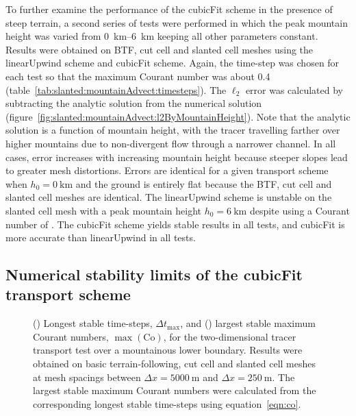 To further examine the performance of the cubicFit scheme in the presence of steep terrain, a second series of tests were performed in which the peak mountain height was varied from \SIrange{0}{6}{\kilo\meter} keeping all other parameters constant.
Results were obtained on BTF, cut cell and slanted cell meshes using the linearUpwind scheme and cubicFit scheme.  Again, the time-step was chosen for each test so that the maximum Courant number was about \num{0.4} (table~\ref{tab:slanted:mountainAdvect:timesteps}).  The $\ell_2$ error was calculated by subtracting the analytic solution from the numerical solution (figure~\ref{fig:slanted:mountainAdvect:l2ByMountainHeight}).
Note that the analytic solution is a function of mountain height, with the tracer travelling farther over higher mountains due to non-divergent flow through a narrower channel.
In all cases, error increases with increasing mountain height because steeper slopes lead to greater mesh distortions.
Errors are identical for a given transport scheme when $h_0 = \SI{0}{\kilo\meter}$ and the ground is entirely flat because the BTF, cut cell and slanted cell meshes are identical.
The linearUpwind scheme is unstable on the slanted cell mesh with a peak mountain height $h_0 = \SI{6}{\kilo\meter}$ despite using a Courant number of \unskip.
The cubicFit scheme yields stable results in all tests, and cubicFit is more accurate than linearUpwind in all tests.

\subsection{Numerical stability limits of the cubicFit transport scheme}

\begin{figure}
	\begin{subfigure}{\textwidth}
		\centering
		
		\label{fig:slanted:mountainAdvect:maxdt:dt}
		\label{fig:slanted:mountainAdvect:maxdt:co}
	\end{subfigure}
	\caption{() Longest stable time-steps, $\Delta t_\mathrm{max}$, and 
	() largest stable maximum Courant numbers, $\max(\mathrm{Co})$, for the two-dimensional tracer transport test over a mountainous lower boundary.  Results were obtained on basic terrain-following, cut cell and slanted cell meshes at mesh spacings between $\Delta x = \SI{5000}{\meter}$ and $\Delta x = \SI{250}{\meter}$.  The largest stable maximum Courant numbers were calculated from the corresponding longest stable time-steps using equation~\eqref{eqn:co}.}
	\label{fig:slanted:mountainAdvect:maxdt}
\end{figure}

